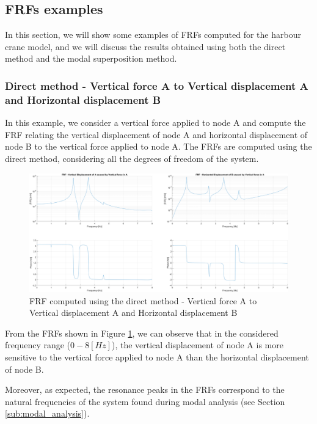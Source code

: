 \subsection{FRFs examples}
\label{subsec:FRFs_examples}

In this section, we will show some examples of FRFs computed for the harbour crane model, and we will discuss the results obtained using both the direct method and the modal superposition method.

\subsubsection{Direct method - Vertical force A to Vertical displacement A and Horizontal displacement B}
\label{subsubsec:direct_method_vertical_force_A}

In this example, we consider a vertical force applied to node A and compute the FRF relating the vertical displacement of node A and horizontal displacement of node B to the vertical force applied to node A.
The FRFs are computed using the direct method, considering all the degrees of freedom of the system.

\begin{figure}[H]
    \centering
    \includegraphics[width=\textwidth]{img/MATLAB/FRFs/Vertical_in_A.png}
    \caption{FRF computed using the direct method - Vertical force A to Vertical displacement A and Horizontal displacement B}
    \label{fig:FRF_direct_vertical_A}
\end{figure}

From the FRFs shown in Figure \ref{fig:FRF_direct_vertical_A}, we can observe that in the considered frequency range ($0-8 [Hz]$), the vertical displacement of node A is more sensitive to the vertical force applied to node A than the horizontal displacement of node B.

Moreover, as expected, the resonance peaks in the FRFs correspond to the natural frequencies of the system found during modal analysis (see Section \ref{sub:modal_analysis}).

